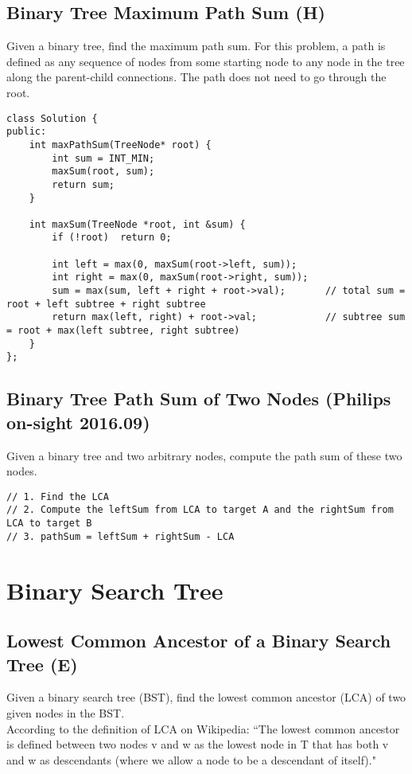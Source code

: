\subsection{Binary Tree Maximum Path Sum (H)}
Given a binary tree, find the maximum path sum. For this problem, a path is defined as any sequence of nodes from some starting node to any node in the tree along the parent-child connections. The path does not need to go through the root. \\

\begin{lstlisting}
class Solution {
public:
    int maxPathSum(TreeNode* root) {
        int sum = INT_MIN;
        maxSum(root, sum);
        return sum;
    }
    
    int maxSum(TreeNode *root, int &sum) {
        if (!root)  return 0;
        
        int left = max(0, maxSum(root->left, sum));
        int right = max(0, maxSum(root->right, sum));
        sum = max(sum, left + right + root->val);       // total sum = root + left subtree + right subtree
        return max(left, right) + root->val;            // subtree sum = root + max(left subtree, right subtree)
    }
};
\end{lstlisting}


\subsection{Binary Tree Path Sum of Two Nodes (Philips on-sight 2016.09)}
Given a binary tree and two arbitrary nodes, compute the path sum of these two nodes.

\begin{lstlisting}
// 1. Find the LCA
// 2. Compute the leftSum from LCA to target A and the rightSum from LCA to target B 
// 3. pathSum = leftSum + rightSum - LCA
\end{lstlisting}


\section{Binary Search Tree}
\subsection{Lowest Common Ancestor of a Binary Search Tree (E)}
Given a binary search tree (BST), find the lowest common ancestor (LCA) of two given nodes in the BST. \\

According to the definition of LCA on Wikipedia: ``The lowest common ancestor is defined between two nodes v and w as the lowest node in T that has both v and w as descendants (where we allow a node to be a descendant of itself)." \\

